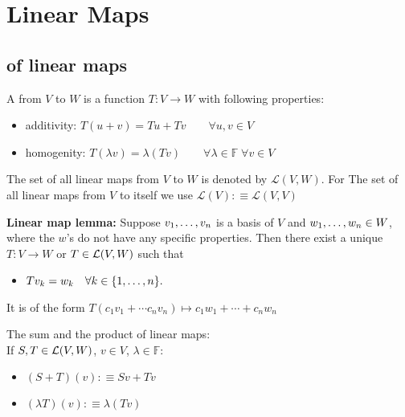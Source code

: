 \chapter{Linear Maps}
\section{\vs of linear maps}

\begin{mydef}
    A \lm from $V$ to $W$ is a function $T:V\to W$ with following properties:
    \begin{itemize}
    	\item additivity: $T(u+v)=Tu + Tv \qquad \forall u,v \in V$
    	\item homogenity: $T(\lambda v)=\lambda (Tv) \qquad
    	\forall \lambda \in \mathbb{F} \; \forall v\in V$
    \end{itemize}
\end{mydef}

\begin{mydef}
    The set of all linear maps from $V$ to $W$ is denoted by $\mathcal{L}(V,W)$. For The set of all linear maps from $V$ to itself we use $\mathcal{L}(V) :\equiv \mathcal{L}(V,V)$
\end{mydef}

\setcounter{thm}{3}
\begin{thm}
    \textbf{Linear map lemma: }
    Suppose $v_1, \dots, v_n$ is a basis of $V$ and $w_1, \dots, w_n \in W$, where the $w$'s do not have any specific properties. Then there exist a unique \lm $T:V\to W$ or $T \in \mathcal{L}(V,W)$ such that
    \begin{itemize}
       	\item[] $Tv_{k} = w_k \quad \forall k \in \{1, \dots, n \}.$
    \end{itemize}
    It is of the form $T(c_1 v_1 + \cdots c_n v_n) \mapsto c_1 w_1 + \cdots + c_n w_n$
\end{thm}

\setcounter{thm}{4}
\begin{mydef}
    The sum and the product of linear maps:\\
    If $S, T \in {\mathcal{L}(V,W)}$, $v \in V$, $\lambda \in \mathbb{F} $:
    \begin{itemize}
    	\item $(S+T)(v) :\equiv Sv+Tv$
    	\item $(\lambda T)(v) : \equiv \lambda (Tv)$
    \end{itemize}
\end{mydef}

